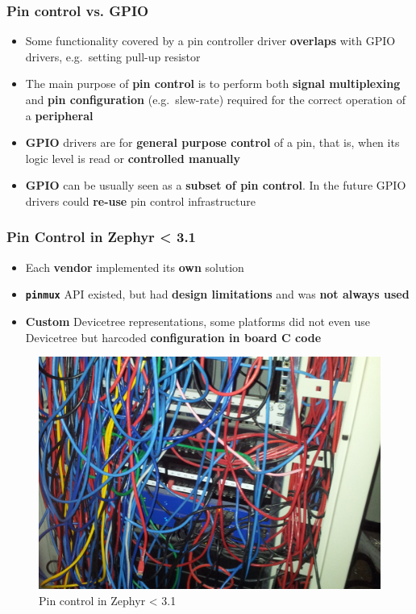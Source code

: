 \documentclass[handout]{beamer}
\begin{document}
\begin{frame}
  \frametitle{Pin control vs. GPIO}

  \begin{itemize}
    \item<1-> Some functionality covered by a pin controller driver
          \textbf{overlaps} with GPIO drivers, e.g.\ setting pull-up resistor
    \item<2-> The main purpose of \textbf{pin control} is to perform both
          \textbf{signal multiplexing} and \textbf{pin configuration}
          (e.g.\ slew-rate) required for the correct operation of a
          \textbf{peripheral}
    \item<3-> \textbf{GPIO} drivers are for \textbf{general purpose control} of
          a pin, that is, when its logic level is read or
          \textbf{controlled manually}
    \item<4-> \textbf{GPIO} can be usually seen as a
          \textbf{subset of pin control}. In the future GPIO drivers could
          \textbf{re-use} pin control infrastructure
  \end{itemize}
\end{frame}

\begin{frame}
  \frametitle{Pin Control in Zephyr < 3.1}

  \begin{itemize}
    \item<1-> Each \textbf{vendor} implemented its \textbf{own} solution
    \item<2-> \textbf{\texttt{pinmux}} API existed, but had
          \textbf{design limitations} and was \textbf{not always used}
    \item<3-> \textbf{Custom} Devicetree representations, some platforms did not
          even use Devicetree but harcoded
          \textbf{configuration in board C code}
  \end{itemize}

  \begin{figure}
    \centering
    \includegraphics[scale=0.2]{cable-mess.jpg}
    \caption{Pin control in Zephyr < 3.1}
  \end{figure}
\end{frame}
\end{document}
